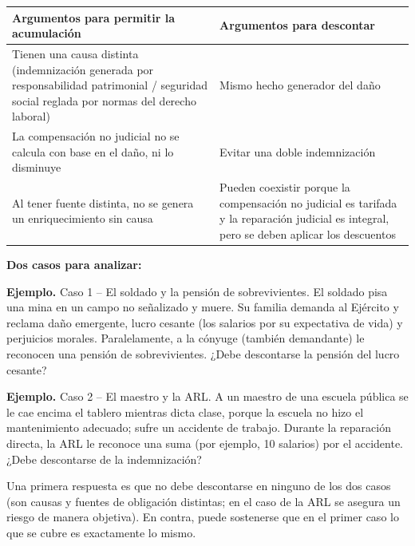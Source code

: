 \begin{tabla}
\begin{longtable}{|>{\raggedright\arraybackslash}m{}|>{\raggedright\arraybackslash}m{}|}
\hline
\cellcolor[HTML]{1F3864}\textcolor[HTML]{FFFFFF}{\textbf{Argumentos para permitir la acumulación}} & \cellcolor[HTML]{1F3864}\textcolor[HTML]{FFFFFF}{\textbf{Argumentos para descontar}} \\ \hline
Tienen una causa distinta (indemnización generada por responsabilidad patrimonial / seguridad social reglada por normas del derecho laboral) & Mismo hecho generador del daño \\ \hline
\cellcolor[HTML]{F2F5FA}La compensación no judicial no se calcula con base en el daño, ni lo disminuye & \cellcolor[HTML]{F2F5FA}Evitar una doble indemnización \\ \hline
Al tener fuente distinta, no se genera un enriquecimiento sin causa & Pueden coexistir porque la compensación no judicial es tarifada y la reparación judicial es integral, pero se deben aplicar los descuentos \\ \hline
\end{longtable}
\end{tabla}
\textbf{Dos casos para analizar:}

\begin{ejemplo}
\textcolor[HTML]{4F6228}{\textbf{Ejemplo. }}Caso 1 – El soldado y la pensión de sobrevivientes. El soldado pisa una mina en un campo no señalizado y muere. Su familia demanda al Ejército y reclama daño emergente, lucro cesante (los salarios por su expectativa de vida) y perjuicios morales. Paralelamente, a la cónyuge (también demandante) le reconocen una pensión de sobrevivientes. ¿Debe descontarse la pensión del lucro cesante?
\par
\textcolor[HTML]{4F6228}{\textbf{Ejemplo. }}Caso 2 – El maestro y la ARL. A un maestro de una escuela pública se le cae encima el tablero mientras dicta clase, porque la escuela no hizo el mantenimiento adecuado; sufre un accidente de trabajo. Durante la reparación directa, la ARL le reconoce una suma (por ejemplo, 10 salarios) por el accidente. ¿Debe descontarse de la indemnización?
\end{ejemplo}
Una primera respuesta es que no debe descontarse en ninguno de los dos casos (son causas y fuentes de obligación distintas; en el caso de la ARL se asegura un riesgo de manera objetiva). En contra, puede sostenerse que en el primer caso lo que se cubre es exactamente lo mismo.

